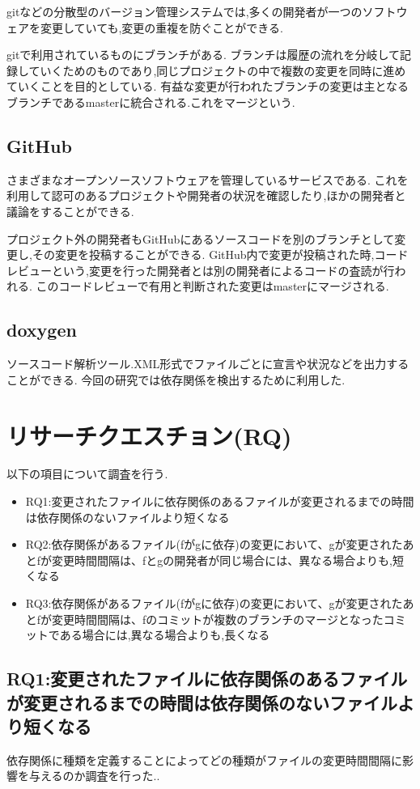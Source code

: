 \documentclass{fose2016}           %
\begin{document}
gitなどの分散型のバージョン管理システムでは,多くの開発者が一つのソフトウェアを変更していても,変更の重複を防ぐことができる.

gitで利用されているものにブランチがある.
ブランチは履歴の流れを分岐して記録していくためのものであり,同じプロジェクトの中で複数の変更を同時に進めていくことを目的としている.
有益な変更が行われたブランチの変更は主となるブランチであるmasterに統合される.これをマージという.

\subsection{GitHub}
さまざまなオープンソースソフトウェアを管理しているサービスである.
これを利用して認可のあるプロジェクトや開発者の状況を確認したり,ほかの開発者と議論をすることができる.

プロジェクト外の開発者もGitHubにあるソースコードを別のブランチとして変更し,その変更を投稿することができる.
GitHub内で変更が投稿された時,コードレビューという,変更を行った開発者とは別の開発者によるコードの査読が行われる.
このコードレビューで有用と判断された変更はmasterにマージされる.

\subsection{doxygen}
ソースコード解析ツール.XML形式でファイルごとに宣言や状況などを出力することができる.
今回の研究では依存関係を検出するために利用した.



\section{リサーチクエスチョン(RQ)}\label{リサーチクエスチョン}
以下の項目について調査を行う.
\begin{itemize}
\item RQ1:変更されたファイルに依存関係のあるファイルが変更されるまでの時間は依存関係のないファイルより短くなる
\item RQ2:依存関係があるファイル(fがgに依存)の変更において、gが変更されたあとfが変更時間間隔は、fとgの開発者が同じ場合には、異なる場合よりも,短くなる
\item RQ3:依存関係があるファイル(fがgに依存)の変更において、gが変更されたあとfが変更時間間隔は、fのコミットが複数のブランチのマージとなったコミットである場合には,異なる場合よりも,長くなる
\end{itemize}
\subsection{RQ1:変更されたファイルに依存関係のあるファイルが変更されるまでの時間は依存関係のないファイルより短くなる}
依存関係に種類を定義することによってどの種類がファイルの変更時間間隔に影響を与えるのか調査を行った..
\end{document}
